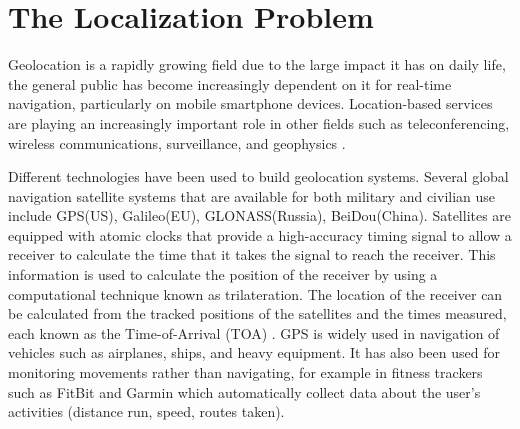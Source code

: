 \label{chapter:introduction}



\section{The Localization Problem} \label{problem}

Geolocation is a rapidly growing field due to the large impact it has on daily life, the general public has become increasingly dependent on it for real-time navigation, particularly on mobile smartphone devices. Location-based services are  playing an increasingly important role in other fields such as teleconferencing, wireless communications, surveillance, and geophysics \cite{Cheung, classMDS, CheungChan, Huang, LiHu,  Sayed,
ShcauRob, SmithAbel,  Yao}.

Different technologies have been used to build geolocation systems. Several global navigation satellite systems that are available for both military and civilian use include GPS(US), Galileo(EU), GLONASS(Russia), BeiDou(China). Satellites are equipped with atomic clocks that provide a high-accuracy timing signal to  allow a receiver to calculate the time that it takes the signal to reach the receiver. This information is used to calculate the position of the receiver by using a  computational technique known as trilateration. The location of the receiver can be calculated from the
tracked positions of the satellites and the times measured, each known as the Time-of-Arrival (TOA) \cite{GeoLoc}.
%
 GPS is widely used in navigation of vehicles such as airplanes, ships, and heavy equipment. It has also been used for monitoring movements rather than navigating, for example in fitness trackers such as FitBit \cite{FB} and Garmin\cite{Garmin} which automatically collect data about the user's activities (distance run, speed, routes taken).
 


